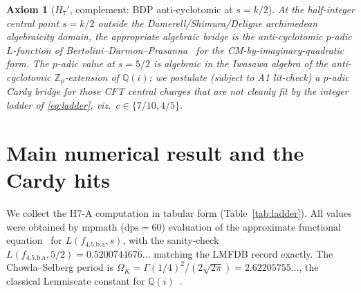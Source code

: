 \documentclass[a4paper,11pt]{article}
\newcommand{\OmK}{\Omega_K}
\newcommand{\fLM}{f_{\text{4.5.b.a}}}
\newcommand{\Qi}{\mathbb{Q}(i)}
\newtheorem*{axiom*}{Axiom}
\theoremstyle{definition}
\theoremstyle{remark}
\begin{document}
\begin{axiom*}[$H_7'$, complement: BDP anti-cyclotomic at $s=k/2$]
At the half-integer central point $s=k/2$ outside the
Damerell/Shimura/Deligne archimedean algebraicity domain, the
appropriate algebraic bridge is the anti-cyclotomic $p$-adic
$L$-function of Bertolini--Darmon--Prasanna~\cite{BDP13} for the
CM-by-imaginary-quadratic form.  The $p$-adic value at $s=5/2$ is
algebraic in the Iwasawa algebra of the anti-cyclotomic
$\mathbb{Z}_p$-extension of $\Qi$; we postulate (subject to A1
lit-check) a $p$-adic Cardy bridge for those CFT central charges that
are \emph{not} cleanly fit by the integer ladder of
\eqref{eq:ladder}, viz.\ $c\in\{7/10,4/5\}$.
\end{axiom*}

\section{Main numerical result and the Cardy hits}
\label{sec:main}

We collect the H7-A computation in tabular form
(Table~\ref{tab:ladder}).  All values were obtained by mpmath
($\mathrm{dps}=60$) evaluation of the approximate functional
equation~\cite[Thm.~5.3]{IwaKow04} for $L(\fLM,s)$, with the
sanity-check $L(\fLM,5/2)=0.5200744676\ldots$ matching the LMFDB
record exactly.  The Chowla--Selberg period is
$\OmK = \Gamma(1/4)^{2}/(2\sqrt{2\pi}) = 2.62205755\ldots$, the
classical Lemniscate constant for $\Qi$~\cite{ChowSel49}.
\end{document}

